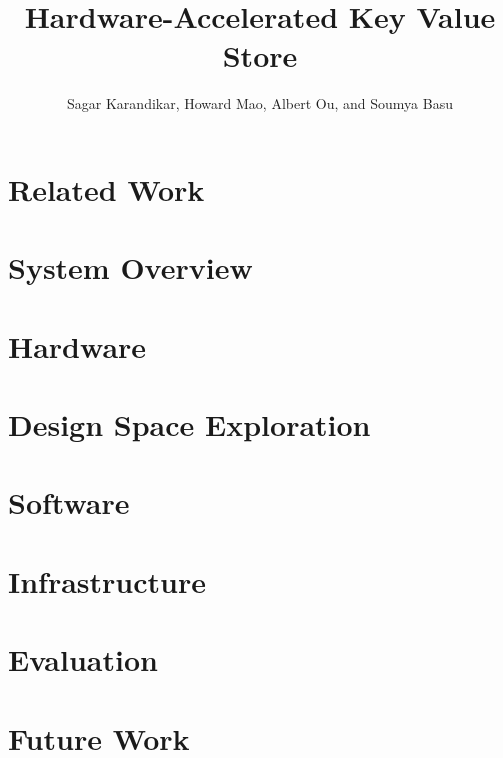 \documentclass[conference]{IEEEtran}
\title{Hardware-Accelerated Key Value Store}
\author{Sagar Karandikar, Howard Mao, Albert Ou, and Soumya Basu}
\begin{document}
\maketitle





\section{Related Work}



\section{System Overview}



\section{Hardware}




\section{Design Space Exploration}



\section{Software}



\section{Infrastructure}



\section{Evaluation}



\section{Future Work}




\nocite{*}
\printbibliography
\end{document}
